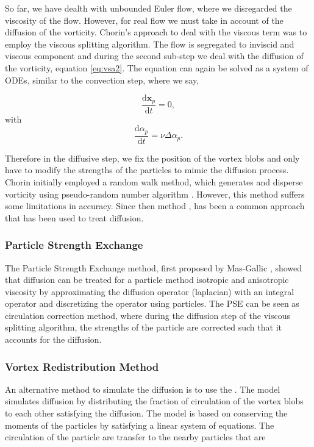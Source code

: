 So far, we have dealth with unbounded Euler flow, where we disregarded the viscosity of the flow. However, for real flow we must take in account of the diffusion of the vorticity. Chorin's approach to deal with the viscous term was to employ the viscous splitting algorithm. The flow is segregated to inviscid and viscous component and during the second sub-step we deal with the diffusion of the vorticity, equation \ref{eq:vsa2}. The equation can again be solved as a system of ODEs, similar to the convection step, where we say,

	\begin{equation}
	\frac{\mathrm{d}\mathbf{x}_p}{\mathrm{d}t} = 0,
	\end{equation}
with
	\begin{equation}
	\frac{\mathrm{d}\alpha_p}{\mathrm{d}t} = \nu\Delta\alpha_p.
	\end{equation}

Therefore in the diffusive step, we fix the position of the vortex blobs and only have to modify the strengths of the particles to mimic the diffusion process. Chorin initially employed a random walk method, which generates and disperse vorticity using pseudo-random number algorithm \cite{Chorin1973}. However, this method suffers some limitations in accuracy. Since then  method \cite{Degond1989}, has been a common approach that has been used to treat diffusion.

\subsubsection*{Particle Strength Exchange}
The Particle Strength Exchange method, first proposed by Mas-Gallic \cite{Degond1989}, showed that diffusion can be treated for a particle method isotropic and anisotropic viscosity by approximating the diffusion operator (laplacian) with an integral operator and discretizing the operator using particles. The PSE can be seen as circulation correction method, where during the diffusion step of the viscous splitting algorithm, the strengths of the particle are corrected such that it accounts for the diffusion.
 
\subsubsection*{Vortex Redistribution Method}
An alternative method to simulate the diffusion is to use the  \cite{Shankar1996}. The model simulates diffusion by distributing the fraction of circulation of the vortex blobs to each other satisfying the diffusion. The model is based on conserving the moments of the particles by satisfying a linear system of equations. The circulation of the particle are transfer to the nearby particles that are 

